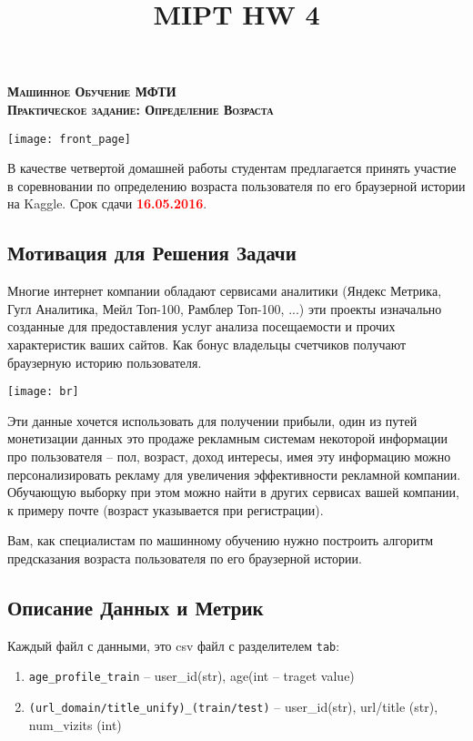 \documentclass[a4paper, 12pt]{article}
\author{}
\date{}
\title{MIPT HW 4}
\begin{document}
  \begin{center}
    \textsc{\textbf{
    	{\Large Машинное Обучение МФТИ \\
        \vspace{0.5cm}
    	Практическое задание: Определение Возраста}}}
  \end{center}

\begin{center}
	\texttt{[image: front\_page]}
\end{center}

В качестве четвертой домашней работы студентам предлагается принять участие в соревновании по определению возраста пользователя по его браузерной истории на Kaggle. Срок сдачи \textbf{\textcolor{red}{16.05.2016}}.

\subsection*{Мотивация для Решения Задачи}

Многие интернет компании обладают сервисами аналитики (Яндекс Метрика, Гугл Аналитика, Мейл Топ-100, Рамблер Топ-100, ...) эти проекты изначально созданные для предоставления услуг анализа посещаемости и прочих характеристик ваших сайтов. Как бонус владельцы счетчиков получают браузерную историю пользователя. 

\begin{center}
	\texttt{[image: br]}
\end{center}

Эти данные хочется использовать для получении прибыли, один из путей монетизации данных это продаже рекламным системам некоторой информации про пользователя -- пол, возраст, доход интересы, имея эту информацию можно персонализировать рекламу для увеличения эффективности рекламной компании. Обучающую выборку при этом можно найти в других сервисах вашей компании, к примеру почте (возраст указывается при регистрации). 

Вам, как специалистам по машинному обучению нужно построить алгоритм предсказания возраста пользователя по его браузерной истории.

\subsection*{Описание Данных и Метрик}

Каждый файл с данными, это csv файл с разделителем \texttt{tab}:
\begin{enumerate}
	\item \texttt{age\_profile\_train} -- user\_id(str), age(int -- traget value)
    \item \texttt{(url\_domain/title\_unify)\_(train/test)} -- user\_id(str), url/title (str), num\_vizits (int)
\end{enumerate}
\end{document}
